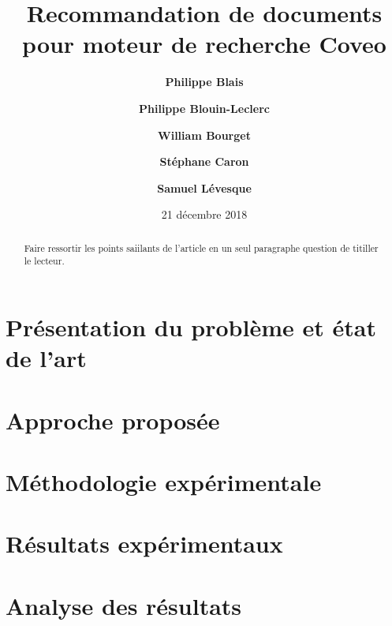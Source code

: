 \documentclass[10pt,letterpaper]{article}
\title{Recommandation de documents pour moteur de recherche Coveo}
\author{{\large \bf Philippe Blais} 
  \and {\large \bf Philippe Blouin-Leclerc}
  \and {\large \bf William Bourget}
  \and {\large \bf Stéphane Caron}
  \and {\large \bf Samuel Lévesque}}
\date{21 décembre 2018}
\numberwithin{equation}{section}
\begin{document}
\maketitle

\begin{multicols}{2}

\begin{abstract}
Faire ressortir les points saiilants de l'article en un seul paragraphe question de titiller le lecteur.
\end{abstract}


\section{Présentation du problème et état de l'art}




\section{Approche proposée}




\section{Méthodologie expérimentale}




\section{Résultats expérimentaux}




\section{Analyse des résultats}






\setlength{\bibleftmargin}{.125in}
\setlength{\bibindent}{-\bibleftmargin}



\end{multicols}
\end{document}
